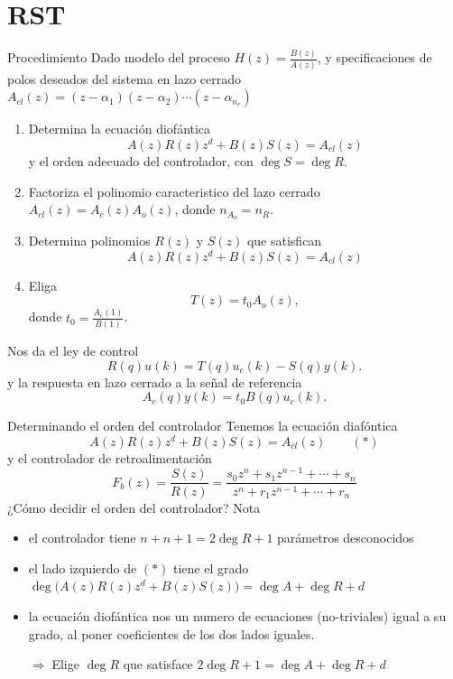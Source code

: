 \documentclass[presentation,aspectratio=169]{beamer}
\begin{document}
\section{RST}
\label{sec:org84aa477}

\begin{frame}[label={sec:orge4ea1b4}]{Procedimiento}
Dado modelo del proceso \(H(z)=\frac{B(z)}{A(z)}\), y specificaciones de polos deseados del sistema en lazo cerrado \(A_{cl}(z) = (z-\alpha_1)(z-\alpha_2) \cdots (z-\alpha_{n_c})\)
\begin{enumerate}
\item Determina la ecuación diofántica
\[ A(z)R(z)z^{d} + B(z)S(z) = A_{cl}(z) \]
y el orden adecuado del controlador, con \(\deg S = \deg R\).
\item Factoriza el polinomio caracteristico del lazo cerrado \(A_{cl}(z) = A_c(z)A_o(z)\), donde \(n_{A_o} = n_R\).
\item Determina polinomios \(R(z)\) y \(S(z)\) que satisfican
\[ A(z)R(z)z^{d} + B(z)S(z) = A_{cl}(z) \]
\item Eliga
\[T(z) = t_0 A_o(z),\] donde \(t_0 = \frac{A_c(1)}{B(1)}\).
\end{enumerate}

Nos da el ley de control 
\[ R(q) u(k) = T(q)u_c(k) - S(q)y(k). \]
y la respuesta en lazo cerrado a la señal de referencia
\[ A_c(q)y(k) = t_0 B(q) u_c(k). \]
\end{frame}

\begin{frame}[label={sec:org6888f63}]{Determinando el orden del controlador}
Tenemos la ecuación diafóntica
   \[ A(z)R(z)z^{d} + B(z)S(z) = A_{cl}(z) \qquad (*) \]
y el controlador de retroalimentación
\[F_b(z) = \frac{S(z)}{R(z)} = \frac{s_0z^n + s_1z^{n-1} + \cdots + s_n}{z^n + r_1 z^{n-1} + \cdots + r_n}\]
\alert{¿Cómo decidir el orden del controlador?} Nota
\begin{itemize}
\item el controlador tiene \(n+n+1 = 2\deg R + 1\) parámetros desconocidos
\item el lado izquierdo de \((*)\) tiene el grado \(\deg \big(A(z)R(z)z^d + B(z)S(z)\big) = \deg A + \deg R + d\)
\item la ecuación diofántica nos un numero de ecuaciones (no-triviales) igual a su grado, al poner coeficientes de los dos lados iguales.

\alert{\(\Rightarrow\;\)Elige \(\deg R\) que satisface \(2\deg R + 1 = \deg A + \deg R + d\)}
\end{itemize}
\end{frame}
\end{document}
